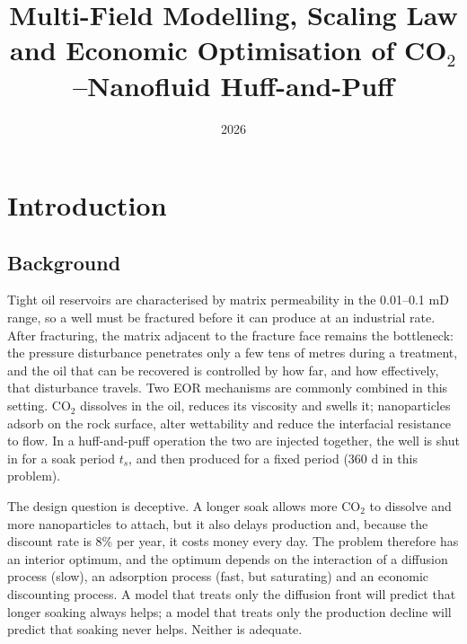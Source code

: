 \documentclass{swmcmthesis}
\title{Multi-Field Modelling, Scaling Law and Economic Optimisation of CO$_2$--Nanofluid Huff-and-Puff}
\date{2026}
\makeatletter
\renewcommand\tableofcontents{%
    \thispagestyle{empty}%
    \if@twocolumn\@restonecoltrue\onecolumn\else\@restonecolfalse\fi
    \phantomsection
    \centerline{\bfseries\Large\contentsname}
    \medskip
    \@mkboth{\MakeUppercase\contentsname}{\MakeUppercase\contentsname}%
    \@starttoc{toc}%
    \if@restonecol\twocolumn\fi}
\makeatother
\begin{document}
\maketitle
\setcounter{tocdepth}{1}
\tableofcontents
\thispagestyle{fancy}
\newpage

\section{Introduction}
\subsection{Background}
Tight oil reservoirs are characterised by matrix permeability in the 0.01--0.1 mD range, so a well must be fractured before it can produce at an industrial rate. After fracturing, the matrix adjacent to the fracture face remains the bottleneck: the pressure disturbance penetrates only a few tens of metres during a treatment, and the oil that can be recovered is controlled by how far, and how effectively, that disturbance travels. Two EOR mechanisms are commonly combined in this setting. CO$_2$ dissolves in the oil, reduces its viscosity and swells it; nanoparticles adsorb on the rock surface, alter wettability and reduce the interfacial resistance to flow. In a huff-and-puff operation the two are injected together, the well is shut in for a soak period $t_s$, and then produced for a fixed period (360 d in this problem).

The design question is deceptive. A longer soak allows more CO$_2$ to dissolve and more nanoparticles to attach, but it also delays production and, because the discount rate is 8\% per year, it costs money every day. The problem therefore has an interior optimum, and the optimum depends on the interaction of a diffusion \cite{crank} process (slow), an adsorption process (fast, but saturating) and an economic discounting process. A model that treats only the diffusion \cite{crank} front will predict that longer soaking always helps; a model that treats only the production decline will predict that soaking never helps. Neither is adequate.
\end{document}
